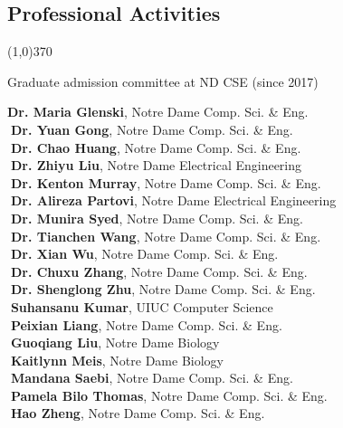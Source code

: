 \documentclass[10pt]{article}
\newenvironment{myindentpar}[1]%
{\begin{list}{}%
         {\setlength{\leftmargin}{#1}}%
         \item[]%
}
{\end{list}}
\newcounter{list}
\begin{document}
\subsection{\sc Professional Activities}
\vspace{-0.4cm} \line(1,0){370} \vspace{-0.1cm}

\begin{myindentpar}{0.75cm}

\hspace{-0.75cm}{\bf Departmental Service}

{\small

\textcolor{white}{} Graduate admission committee at ND CSE (since 2017)
}

\hspace{-0.75cm}{\bf Ph.D. Thesis Committee}

{\small

\textcolor{white}{} {\bf Dr. Maria Glenski}, Notre Dame Comp. Sci. \& Eng. \\
\textcolor{white}{.}{\bf Dr. Yuan Gong}, Notre Dame Comp. Sci. \& Eng. \\
\textcolor{white}{.}{\bf Dr. Chao Huang}, Notre Dame Comp. Sci. \& Eng. \\
\textcolor{white}{.}{\bf Dr. Zhiyu Liu}, Notre Dame Electrical Engineering \\
\textcolor{white}{.}{\bf Dr. Kenton Murray}, Notre Dame Comp. Sci. \& Eng. \\
\textcolor{white}{.}{\bf Dr. Alireza Partovi}, Notre Dame Electrical Engineering \\
\textcolor{white}{.}{\bf Dr. Munira Syed}, Notre Dame Comp. Sci. \& Eng. \\
\textcolor{white}{.}{\bf Dr. Tianchen Wang}, Notre Dame Comp. Sci. \& Eng. \\
\textcolor{white}{.}{\bf Dr. Xian Wu}, Notre Dame Comp. Sci. \& Eng. \\
\textcolor{white}{.}{\bf Dr. Chuxu Zhang}, Notre Dame Comp. Sci. \& Eng. \\
\textcolor{white}{.}{\bf Dr. Shenglong Zhu}, Notre Dame Comp. Sci. \& Eng. \\
\textcolor{white}{.}{\bf Suhansanu Kumar}, UIUC Computer Science \\
\textcolor{white}{.}{\bf Peixian Liang}, Notre Dame Comp. Sci. \& Eng. \\
\textcolor{white}{.}{\bf Guoqiang Liu}, Notre Dame Biology \\
\textcolor{white}{.}{\bf Kaitlynn Meis}, Notre Dame Biology \\
\textcolor{white}{.}{\bf Mandana Saebi}, Notre Dame Comp. Sci. \& Eng. \\
\textcolor{white}{.}{\bf Pamela Bilo Thomas}, Notre Dame Comp. Sci. \& Eng. \\
\textcolor{white}{.}{\bf Hao Zheng}, Notre Dame Comp. Sci. \& Eng.
}


\end{myindentpar}
\end{document}
